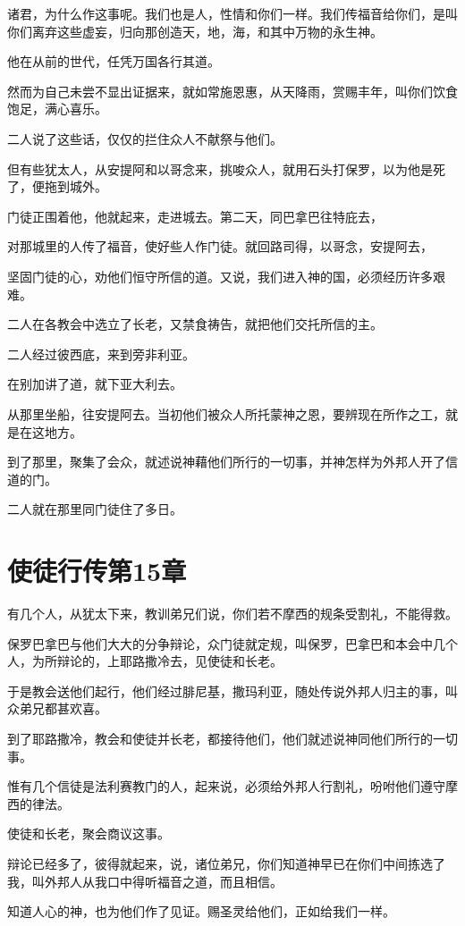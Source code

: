 \documentclass[12pt,oneside]{book}
\begin{document}
诸君，为什么作这事呢。我们也是人，性情和你们一样。我们传福音给你们，是叫你们离弃这些虚妄，归向那创造天，地，海，和其中万物的永生神。

他在从前的世代，任凭万国各行其道。

然而为自己未尝不显出证据来，就如常施恩惠，从天降雨，赏赐丰年，叫你们饮食饱足，满心喜乐。

二人说了这些话，仅仅的拦住众人不献祭与他们。

但有些犹太人，从安提阿和以哥念来，挑唆众人，就用石头打保罗，以为他是死了，便拖到城外。

门徒正围着他，他就起来，走进城去。第二天，同巴拿巴往特庇去，

对那城里的人传了福音，使好些人作门徒。就回路司得，以哥念，安提阿去，

坚固门徒的心，劝他们恒守所信的道。又说，我们进入神的国，必须经历许多艰难。

二人在各教会中选立了长老，又禁食祷告，就把他们交托所信的主。

二人经过彼西底，来到旁非利亚。

在别加讲了道，就下亚大利去。

从那里坐船，往安提阿去。当初他们被众人所托蒙神之恩，要辨现在所作之工，就是在这地方。

到了那里，聚集了会众，就述说神藉他们所行的一切事，并神怎样为外邦人开了信道的门。

二人就在那里同门徒住了多日。

\chapter{使徒行传第15章}
有几个人，从犹太下来，教训弟兄们说，你们若不摩西的规条受割礼，不能得救。

保罗巴拿巴与他们大大的分争辩论，众门徒就定规，叫保罗，巴拿巴和本会中几个人，为所辩论的，上耶路撒冷去，见使徒和长老。

于是教会送他们起行，他们经过腓尼基，撒玛利亚，随处传说外邦人归主的事，叫众弟兄都甚欢喜。

到了耶路撒冷，教会和使徒并长老，都接待他们，他们就述说神同他们所行的一切事。

惟有几个信徒是法利赛教门的人，起来说，必须给外邦人行割礼，吩咐他们遵守摩西的律法。

使徒和长老，聚会商议这事。

辩论已经多了，彼得就起来，说，诸位弟兄，你们知道神早已在你们中间拣选了我，叫外邦人从我口中得听福音之道，而且相信。

知道人心的神，也为他们作了见证。赐圣灵给他们，正如给我们一样。
\end{document}
